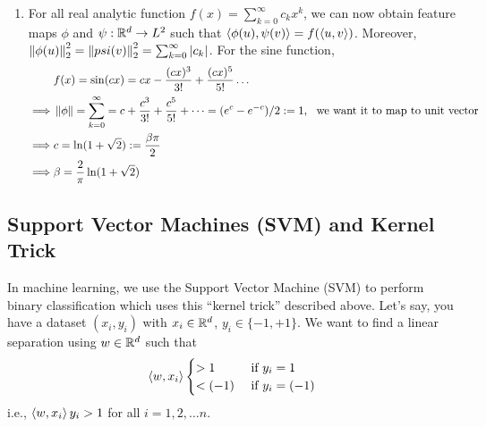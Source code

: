 \documentclass[12pt]{article}
\begin{document}
\begin{enumerate}
    \item For all real analytic function $f(x) = \sum_{k=0}^\infty c_k x^k$, we can now obtain feature maps $\phi$ and $\psi: \mathbb{R}^d \rightarrow L^2$ such that $\left\langle \phi(u), \psi(v) \right\rangle = f(\left\langle u, v \right\rangle)$. Moreover, $\left\Vert \phi(u) \right\Vert_2^2 = \left\Vert psi(v) \right\Vert_2^2 = \sum_{k=0}^\infty \left\lvert c_k \right\rvert$. For the sine function,
    \begin{align*}
        & f(x) = \sin(cx) = cx - \dfrac{(cx)^3}{3!} + \dfrac{(cx)^5}{5!} \dots \\
        \implies & \norm{\phi} = \sum_{k=0}^{\infty} = c + \dfrac{c^3}{3!} + \dfrac{c^5}{5!} + \dots = (e^c - e^{-c})/2 := 1, \ \text{ we want it to map to unit vector}\\
        \implies & c = \ln(1 + \sqrt{2}) := \dfrac{\beta \pi}{2}\\
        \implies & \beta = \dfrac{2}{\pi}\ln(1 + \sqrt{2})
    \end{align*}
\end{enumerate}

\subsection{Support Vector Machines (SVM) and Kernel Trick}

In machine learning, we use the Support Vector Machine (SVM) to perform binary classification which uses this ``kernel trick'' described above. Let's say, you have a dataset $(x_i, y_i)$ with $x_i \in \mathbb{R}^d$, $y_i \in \{-1, +1 \}$. We want to find a linear separation using $w \in \mathbb{R}^d$ such that
\begin{equation*}
    \left\langle w, x_i \right\rangle \begin{cases}
        > 1 & \text{ if } y_i = 1\\
        < (-1) & \text{ if } y_i = (-1)
    \end{cases}
\end{equation*}
\noindent i.e., $\left\langle w, x_i \right\rangle y_i > 1$ for all $i = 1, 2, \dots n$.
\end{document}
